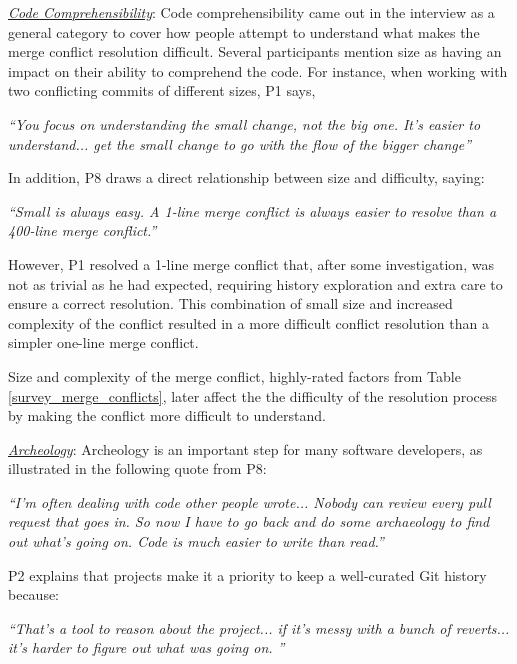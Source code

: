 \underline{\textit{Code Comprehensibility}}:
Code comprehensibility came out in the interview as a general category to cover how people attempt to understand what makes the merge conflict resolution difficult. Several participants mention size as having an impact on their ability to comprehend the code. For instance, when working with two conflicting commits of different sizes, P1 says,
\begin{displayquote}
\textit{``You focus on understanding the small change, not the big one. It's easier to understand... get the small change to go with the flow of the bigger change''}
\end{displayquote}	

In addition, P8 draws a direct relationship between size and difficulty, saying:
\begin{displayquote}
\textit{``Small is always easy. A 1-line merge conflict is always easier to resolve than a 400-line merge conflict.''}
\end{displayquote}

However, P1 resolved a 1-line merge conflict that, after some investigation, was not as trivial as he had expected, requiring history exploration and extra care to ensure a correct resolution. This combination of small size and increased complexity of the conflict resulted in a more difficult conflict resolution than a simpler one-line merge conflict.

\begin{tcolorbox}[enhanced,minipage boxed title,enhanced,title={Takeaway \arabic{takeawaycounter}},
attach boxed title to top left=
{xshift=0mm,yshift=-1mm},
boxed title style={size=small}]
Size and complexity of the merge conflict, highly-rated factors from Table \ref{survey_merge_conflicts}, later affect the the difficulty of the resolution process by making the conflict more difficult to understand.
\end{tcolorbox}
\addtocounter{takeawaycounter}{1}

\underline{\textit{Archeology}}:
Archeology is an important step for many software developers, as illustrated in the following quote from P8:
\begin{displayquote}
\textit{``I'm often dealing with code other people wrote... Nobody can review every pull request that goes in. So now I have to go back and do some archaeology to find out what's going on. Code is much easier to write than read.''}
\end{displayquote}
P2 explains that projects make it a priority to keep a well-curated Git history because:
\begin{displayquote}
\textit{``That's a tool to reason about the project... if it's messy with a bunch of reverts... it's harder to figure out what was going on.	''}
\end{displayquote}

